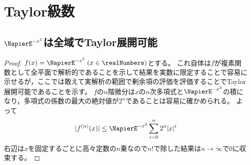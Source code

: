 \chapter{Taylor級数}
    \section{\texorpdfstring{$\NapierE^{-x^2}$}{e\string^(-x\string^2)}は全域でTaylor展開可能}
        \begin{proof}
            $f(x) = \NapierE^{-x^2}\;(x\in\realNumbers)$とする。
            これ自体は$f$が複素関数として全平面で解析的であることを示して結果を実数に限定することで容易に示せるが，ここでは敢えて実解析の範囲で剰余項の評価を評価することでTaylor展開可能であることを示す。
            $f$の$n$階微分は$x$の$n$次多項式と$\NapierE^{-x^2}$の積になり，多項式の係数の最大の絶対値が$2^n$であることは容易に確かめられる。
            よって
            \[ |f^{(n)}(x)| \leq \NapierE^{-x^2}\sum_{i=0}^n 2^n |x|^i \]
            右辺は$x$を固定するごとに高々定数の$n$乗なので$n!$で除した結果は$n\to\infty$で0に収束する。
        \end{proof}
